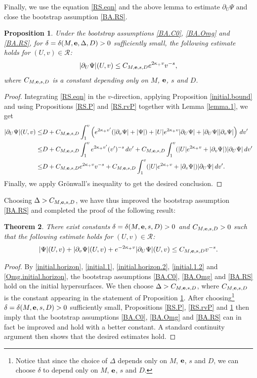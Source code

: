 \documentclass[10pt, reqno]{amsart}
\newtheorem{theorem}{Theorem}[section]
\newtheorem{proposition}[theorem]{Proposition}
\theoremstyle{definition}
\theoremstyle{remark}
\numberwithin{equation}{section}
\newcommand{\rd}{\partial}
\newcommand{\0}{\emptyset}
\newcommand{\de}{\delta}
\begin{document}
Finally, we use the equation \eqref{RS.eqn} and the above lemma to estimate $\rd_U\Psi$ and close the bootstrap assumption \eqref{BA.RS}.
\begin{proposition}\label{RS.ruP}
Under the bootstrap assumptions \eqref{BA.C0}, \eqref{BA.Omg} and \eqref{BA.RS}, for $\de=\de(M,{\bf e},\Delta,D)>0$ sufficiently small, the following estimate holds for $(U,v)\in \mathcal R$:
$$|\rd_U\Psi|(U,v)\leq C_{M,{\bf e},s,D} e^{2\kappa_+ v} v^{-s},$$
where $C_{M,{\bf e},s,D}$ is a constant depending only on $M$, ${\bf e}$, $s$ and $D$.
\end{proposition}
\begin{proof}
Integrating \eqref{RS.eqn} in the $v$-direction, applying Proposition \ref{initial.bound} and using Propositions \ref{RS.P} and \ref{RS.rvP} together with Lemma \ref{lemma.1}, we get
\begin{equation*}
\begin{split}
|\rd_U\Psi|(U,v)\leq & D+C_{M,{\bf e},s,D}\int_1^v \left(e^{2\kappa_+ v'}(|\rd_v\Psi|+|\Psi|)+ |U|e^{2\kappa_+ v} |\rd_U\Psi|+|\rd_U\Psi||\rd_v\Psi|\right)\, dv'\\
\leq &D+C_{M,{\bf e},s,D} \int_1^v e^{2\kappa_+ v'} (v')^{-s}\, dv'+C_{M,{\bf e},s,D}\int_1^v (|U|e^{2\kappa_+ v}+|\rd_v\Psi|)|\rd_U\Psi|\, dv'\\
\leq &D+C_{M,{\bf e},s,D} e^{2\kappa_+ v} v^{-s} +C_{M,{\bf e},s,D}\int_1^v (|U|e^{2\kappa_+ v}+|\rd_v\Psi|)|\rd_U\Psi|\, dv'.
\end{split}
\end{equation*}
Finally, we apply Gr\"onwall's inequality to get the desired conclusion.
\end{proof}
Choosing $\Delta>C_{M,{\bf e},s,D}$, we have thus improved the bootstrap assumption \eqref{BA.RS} and completed the proof of the following result:
\begin{theorem}\label{RS.prop}
There exist constants $\de=\de(M,{\bf e},s,D)>0$ and $C_{M,{\bf e},s,D}>0$ such that the following estimate holds for $(U,v)\in \mathcal R$:
$$|\Psi|(U,v)+|\rd_v\Psi|(U,v)+e^{-2\kappa_+ v}|\rd_U\Psi|(U,v)\leq C_{M,{\bf e},s,D}  v^{-s}.$$
\end{theorem}
\begin{proof}
By \eqref{initial.horizon}, \eqref{initial.1}, \eqref{initial.horizon.2}, \eqref{initial.1.2} and \eqref{Omg.initial.horizon}, the bootstrap assumptions \eqref{BA.C0}, \eqref{BA.Omg} and \eqref{BA.RS} hold on the initial hypersurfaces. We then choose $\Delta>C_{M,{\bf e},s,D}$, where $C_{M,{\bf e},s,D}$ is the constant appearing in the statement of Proposition \ref{RS.ruP}. After choosing\footnote{Notice that since the choice of $\Delta$ depends only on $M$, ${\bf e}$, $s$ and $D$, we can choose $\de$ to depend only on $M$, ${\bf e}$, $s$ and $D$.} $\de=\de(M,{\bf e},s,D)>0$ sufficiently small,  Propositions \ref{RS.P}, \ref{RS.rvP} and \ref{RS.ruP} then imply that the bootstrap assumptions \eqref{BA.C0}, \eqref{BA.Omg} and \eqref{BA.RS} can in fact be improved and hold with a better constant. A standard continuity argument then shows that the desired estimates hold.
\end{proof}
\end{document}
